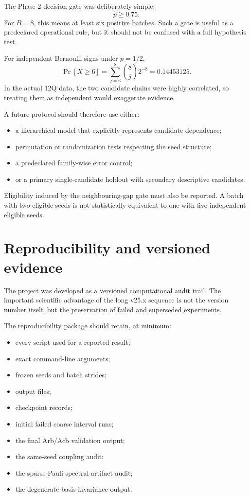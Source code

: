 \documentclass[11pt,a4paper]{article}
\begin{document}
The Phase-2 decision gate was deliberately simple:
\[
\widehat p\ge0.75.
\]
For \(B=8\), this means at least six positive batches.  Such a gate is useful
as a predeclared operational rule, but it should not be confused with a full
hypothesis test.

For independent Bernoulli signs under \(p=1/2\),
\[
\Pr[X\ge6]
=
\sum_{j=6}^{8}
\binom{8}{j}2^{-8}
=
0.14453125.
\]
In the actual 12Q data, the two candidate chains were highly correlated, so
treating them as independent would exaggerate evidence.

A future protocol should therefore use either:

\begin{itemize}
\item a hierarchical model that explicitly represents candidate dependence;
\item permutation or randomization tests respecting the seed structure;
\item a predeclared family-wise error control;
\item or a primary single-candidate holdout with secondary descriptive
      candidates.
\end{itemize}

Eligibility induced by the neighbouring-gap gate must also be reported.
A batch with two eligible seeds is not statistically equivalent to one with
five independent eligible seeds.

\section{Reproducibility and versioned evidence}

The project was developed as a versioned computational audit trail.  The
important scientific advantage of the long v25.x sequence is not the version
number itself, but the preservation of failed and superseded experiments.

The reproducibility package should retain, at minimum:

\begin{itemize}
\item every script used for a reported result;
\item exact command-line arguments;
\item frozen seeds and batch strides;
\item output files;
\item checkpoint records;
\item initial failed coarse interval runs;
\item the final Arb/Acb validation output;
\item the same-seed coupling audit;
\item the sparse-Pauli spectral-artifact audit;
\item the degenerate-basis invariance output.
\end{itemize}
\end{document}
